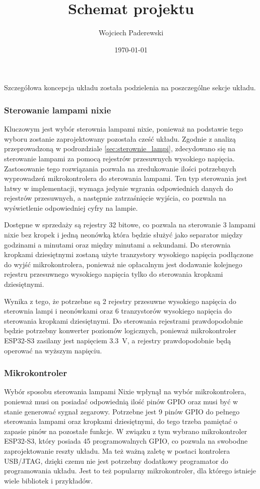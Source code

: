 \documentclass[../main.tex]{subfiles}
\author{Wojciech Paderewski}
\date{\today}
\title{Schemat projektu}
\begin{document}
Szczegółowa koncepcja układu została podzielenia na poszczególne sekcje układu.

\subsubsection{Sterowanie lampami nixie}
Kluczowym jest wybór sterownia lampami nixie, ponieważ na podstawie tego wyboru zostanie zaprojektowany pozostała cześć układu.
Zgodnie z analizą przeprowadzoną w podrozdziale \ref{sec:sterownie_lampi}, zdecydowano się na sterowanie lampami za pomocą rejestrów przesuwnych wysokiego napięcia.
Zastosowanie tego rozwiązania pozwala na zredukowanie ilości potrzebnych wyprowadzeń mikrokontrolera do sterowania lampami. Ten typ sterowania jest łatwy w implementacji,
wymaga jedynie wgrania odpowiednich danych do rejestrów przesuwnych, a następnie zatrzaśnięcie
 wyjścia, co pozwala na wyświetlenie odpowiedniej cyfry na lampie.

Dostępne w sprzedaży są rejestry 32 bitowe, co pozwala na sterowanie 3 lampami nixie bez kropek i jedną neonówką która będzie
służyć jako separator między godzinami a minutami oraz między minutami a sekundami. Do sterownia kropkami dziesiętnymi zostaną użyte tranzystory wysokiego napięcia podłączone do wyjść mikrokontrolera,
ponieważ nie opłacalnym jest dodawanie kolejnego rejestru przesuwnego wysokiego napięcia tylko do sterowania kropkami dziesiętnymi.

Wynika z tego, że potrzebne są 2 rejestry przesuwne wysokiego napięcia do sterownia lampi i neonówkami oraz 6 tranzystorów wysokiego napięcia do sterowania kropkami dziesiętnymi.
Do sterowania rejestrami prawdopodobnie będzie potrzebny konwerter poziomów logicznych, ponieważ mikrokontroler ESP32-S3 zasilany jest napięciem \SI{3.3}{\volt}, a rejestry prawdopodobnie będą operować na wyższym napięciu.
\subsubsection{Mikrokontroler}
Wybór sposobu sterowania lampami Nixie wpłynął na wybór mikrokontrolera, ponieważ musi on posiadać odpowiednią ilość pinów GPIO oraz musi być w stanie generować sygnał zegarowy.
Potrzebne jest 9 pinów GPIO do pełnego sterowania lampami oraz kropkami dziesiętnymi, do tego trzeba pamiętać o zapasie pinów na pozostałe funkcje. W związku z tym
wybrano mikrokontroler ESP32-S3, który posiada 45 programowalnych GPIO, co pozwala na swobodne zaprojektowanie reszty układu. Ma też ważną zaletę w postaci kontrolera USB/JTAG,
dzięki czemu nie jest potrzebny dodatkowy programator do programowania układu. Jest to też popularny mikrokontroler, dla którego istnieje wiele bibliotek i przykładów.
\end{document}
